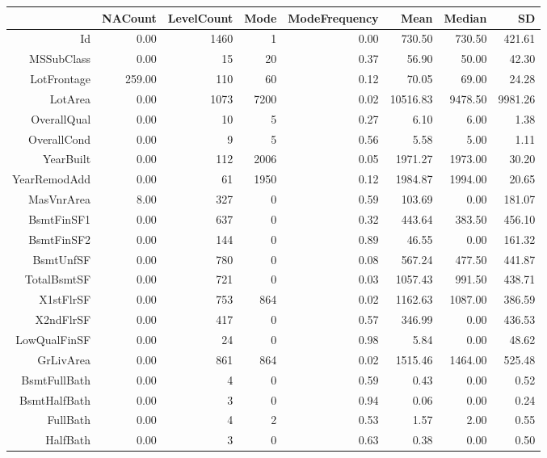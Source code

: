 \begin{table}[ht]
\centering
\begin{tabular}{rrrrrrrr}
  \hline
 & NACount & LevelCount & Mode & ModeFrequency & Mean & Median & SD \\ 
  \hline
Id & 0.00 & 1460 &   1 & 0.00 & 730.50 & 730.50 & 421.61 \\ 
  MSSubClass & 0.00 &  15 &  20 & 0.37 & 56.90 & 50.00 & 42.30 \\ 
  LotFrontage & 259.00 & 110 &  60 & 0.12 & 70.05 & 69.00 & 24.28 \\ 
  LotArea & 0.00 & 1073 & 7200 & 0.02 & 10516.83 & 9478.50 & 9981.26 \\ 
  OverallQual & 0.00 &  10 &   5 & 0.27 & 6.10 & 6.00 & 1.38 \\ 
  OverallCond & 0.00 &   9 &   5 & 0.56 & 5.58 & 5.00 & 1.11 \\ 
  YearBuilt & 0.00 & 112 & 2006 & 0.05 & 1971.27 & 1973.00 & 30.20 \\ 
  YearRemodAdd & 0.00 &  61 & 1950 & 0.12 & 1984.87 & 1994.00 & 20.65 \\ 
  MasVnrArea & 8.00 & 327 &   0 & 0.59 & 103.69 & 0.00 & 181.07 \\ 
  BsmtFinSF1 & 0.00 & 637 &   0 & 0.32 & 443.64 & 383.50 & 456.10 \\ 
  BsmtFinSF2 & 0.00 & 144 &   0 & 0.89 & 46.55 & 0.00 & 161.32 \\ 
  BsmtUnfSF & 0.00 & 780 &   0 & 0.08 & 567.24 & 477.50 & 441.87 \\ 
  TotalBsmtSF & 0.00 & 721 &   0 & 0.03 & 1057.43 & 991.50 & 438.71 \\ 
  X1stFlrSF & 0.00 & 753 & 864 & 0.02 & 1162.63 & 1087.00 & 386.59 \\ 
  X2ndFlrSF & 0.00 & 417 &   0 & 0.57 & 346.99 & 0.00 & 436.53 \\ 
  LowQualFinSF & 0.00 &  24 &   0 & 0.98 & 5.84 & 0.00 & 48.62 \\ 
  GrLivArea & 0.00 & 861 & 864 & 0.02 & 1515.46 & 1464.00 & 525.48 \\ 
  BsmtFullBath & 0.00 &   4 &   0 & 0.59 & 0.43 & 0.00 & 0.52 \\ 
  BsmtHalfBath & 0.00 &   3 &   0 & 0.94 & 0.06 & 0.00 & 0.24 \\ 
  FullBath & 0.00 &   4 &   2 & 0.53 & 1.57 & 2.00 & 0.55 \\ 
  HalfBath & 0.00 &   3 &   0 & 0.63 & 0.38 & 0.00 & 0.50 \\ 

\end{tabular}
\end{table}
